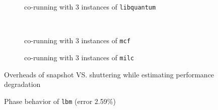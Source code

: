 \documentclass{sig-alternate}
\begin{document}
\begin{figure*}
\centering
\begin{subfigure}[t]{2\columnwidth}
\centering
{}
\caption{co-running with 3 instances of \texttt{libquantum}}
\label{fig:overheadlibquantum}
\end{subfigure}
\hfill\\
\begin{subfigure}[t]{2\columnwidth}
\centering
{}
\caption{co-running with 3 instances of \texttt{mcf}}
\label{fig:overheadmcf}
\end{subfigure}
\hfill
\begin{subfigure}[t]{2\columnwidth}
\centering
{}
\caption{co-running with 3 instances of \texttt{milc}}
\label{fig:overheadmilc}
\end{subfigure}
\caption{Overheads of snapshot VS. shuttering while estimating performance degradation}
\label{fig:Overhead}
\end{figure*}
\begin{figure}
\centering
\begin{minipage}[t]{1\columnwidth}
\centering
{}
\caption{Phase behavior of \texttt{lbm} (error 2.59\%) \vspace{-0.1in}}
\label{fig:lbmsnapshotlib}
\end{minipage}
\end{figure}
\end{document}
